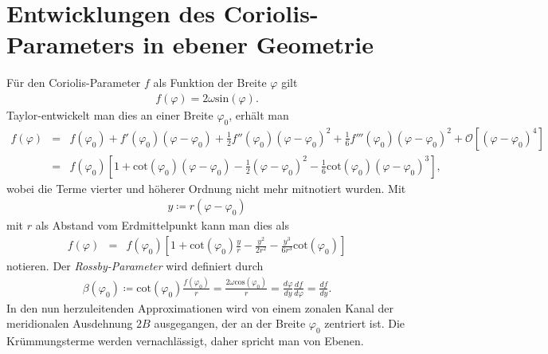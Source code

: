 \documentclass{book}
\renewcommand{\sin}{\text{sin}}
\renewcommand{\cos}{\text{cos}}
\renewcommand{\cot}{\text{cot}}
\begin{document}
\section{Entwicklungen des Coriolis-Parameters in ebener Geometrie}
\label{sec:entwicklungen_des_coriolisparameters_in_ebener_geometrie}

Für den Coriolis-Parameter $f$ als Funktion der Breite $\varphi$ gilt
%
\begin{eqnarray}
f\left(\varphi\right) = 2\omega\sin\left(\varphi\right).
\end{eqnarray}
%
Taylor-entwickelt man dies an einer Breite $\varphi_0$, erhält man
%
\begin{eqnarray}
f\left(\varphi\right) & = & f\left(\varphi_0\right) + f'\left(\varphi_0\right)\left(\varphi - \varphi_0\right) + \frac{1}{2}f''\left(\varphi_0\right)\left(\varphi - \varphi_0\right)^2 + \frac{1}{6}f'''\left(\varphi_0\right)\left(\varphi - \varphi_0\right)^2 + \mathcal{O}\left[\left(\varphi - \varphi_0\right)^4\right]\nonumber\\
& = & f\left(\varphi_0\right)\left[1 + \cot\left(\varphi_0\right)\left(\varphi - \varphi_0\right) - \frac{1}{2}\left(\varphi - \varphi_0\right)^2 - \frac{1}{6}\cot\left(\varphi_0\right)\left(\varphi - \varphi_0\right)^3\right], 
\end{eqnarray}
%
wobei die Terme vierter und höherer Ordnung nicht mehr mitnotiert wurden. Mit
%
\begin{eqnarray}
y \coloneqq r\left(\varphi - \varphi_0\right)
\end{eqnarray}
%
mit $r$ als Abstand vom Erdmittelpunkt kann man dies als
%
\begin{eqnarray}
f\left(\varphi\right) & = & f\left(\varphi_0\right)\left[1 + \cot\left(\varphi_0\right)\frac{y}{r} - \frac{y^2}{2r^2} - \frac{y^3}{6r^3}\cot\left(\varphi_0\right)\right]\label{eq:f_dev}
\end{eqnarray}
%
notieren. Der \textit{Rossby-Parameter} wird definiert durch
%
\begin{eqnarray}
\beta\left(\varphi_0\right) \coloneqq \cot\left(\varphi_0\right)\frac{f\left(\varphi_0\right)}{r} = \frac{2\omega\cos\left(\varphi_0\right)}{r} = \frac{d\varphi}{dy}\frac{df}{d\varphi} = \frac{df}{dy}.
\end{eqnarray}
%
In den nun herzuleitenden Approximationen wird von einem zonalen Kanal der meridionalen Ausdehnung $2B$ ausgegangen, der an der Breite $\varphi_0$ zentriert ist. Die Krümmungsterme werden vernachlässigt, daher spricht man von Ebenen.
\end{document}

